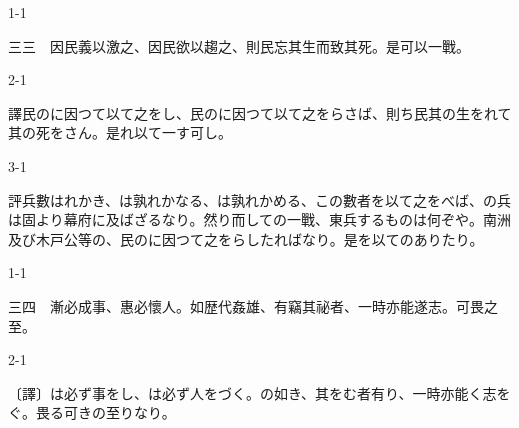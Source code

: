 \documentclass[tate,paper=b6j,jafontsize=9pt]{jlreq}
\begin{document}
\begin{azconvIndented}{1\zw}{-1\zw}

三三　因民義以激之、因民欲以趨之、則民忘其生而致其死。是可以一戰。

\end{azconvIndented}
\begin{azconvIndented}{2\zw}{-1\zw}

譯民のに因つて以て之をし、民のに因つて以て之をらさば、則ち民其の生をれて其の死をさん。是れ以て一す可し。

\end{azconvIndented}
\begin{azconvIndented}{3\zw}{-1\zw}

評兵數はれかき、は孰れかなる、は孰れかめる、この數者を以て之をべば、の兵は固より幕府に及ばざるなり。然り而しての一戰、東兵するものは何ぞや。南洲及び木戸公等の、民のに因つて之をらしたればなり。是を以てのありたり。

\end{azconvIndented}

\begin{azconvIndented}{1\zw}{-1\zw}

三四　漸必成事、惠必懷人。如歴代姦雄、有竊其祕者、一時亦能遂志。可畏之至。

\end{azconvIndented}
\begin{azconvIndented}{2\zw}{-1\zw}

〔譯〕は必ず事をし、は必ず人をづく。の如き、其をむ者有り、一時亦能く志をぐ。畏る可きの至りなり。

\end{azconvIndented}
\end{document}
